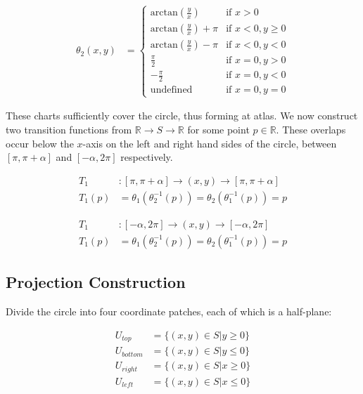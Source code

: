 \documentclass{article}
\newcommand{\lp}{\left(} %
\newcommand{\rp}{\right)} %
\begin{document}
        \begin{align*}
            \theta_2(x,y) &= 
            \begin{cases}
                \textrm{arctan}(\frac{y}{x}) & \textrm{if } x > 0 \\
                \textrm{arctan}(\frac{y}{x}) + \pi & \textrm{if } x < 0, y \geq 0 \\
                \textrm{arctan}(\frac{y}{x}) - \pi & \textrm{if } x < 0, y < 0 \\
                \frac{\pi}{2} & \textrm{if } x = 0, y > 0 \\
                -\frac{\pi}{2} & \textrm{if } x = 0, y < 0 \\
                \textrm{undefined} & \textrm{if } x = 0, y = 0
            \end{cases}
        \end{align*}

        These charts sufficiently cover the circle, thus forming at atlas. We now construct two transition functions from $\mathbb{R} \rightarrow S \rightarrow \mathbb{R}$ for some point $p \in \mathbb{R}$. These overlaps occur below the $x$-axis on the left and right hand sides of the circle, between $[\pi, \pi + \alpha]$ and $[-\alpha, 2 \pi]$ respectively.

        \begin{align*}
            T_1 &: [\pi, \pi + \alpha] \rightarrow (x,y) \rightarrow [\pi, \pi + \alpha] \\
            T_1(p) &= \theta_1 \lp \theta_2^{-1}(p) \rp = \theta_2 \lp \theta_1^{-1}(p) \rp = p
        \end{align*}

        \begin{align*}
            T_1 &: [-\alpha, 2 \pi] \rightarrow (x,y) \rightarrow [- \alpha, 2 \pi] \\
            T_1(p) &= \theta_1 \lp \theta_2^{-1}(p) \rp = \theta_2 \lp \theta_1^{-1}(p) \rp = p
        \end{align*}

    \subsection{Projection Construction}

        Divide the circle into four coordinate patches, each of which is a half-plane:

        \begin{align*}
            U_{top} &= \{(x,y) \in S | y \geq 0 \} \\
            U_{bottom} &= \{(x,y) \in S | y \leq 0 \} \\
            U_{right} &= \{(x,y) \in S | x \geq 0 \} \\
            U_{left} &= \{(x,y) \in S | x \leq 0 \} \\
        \end{align*}
\end{document}
